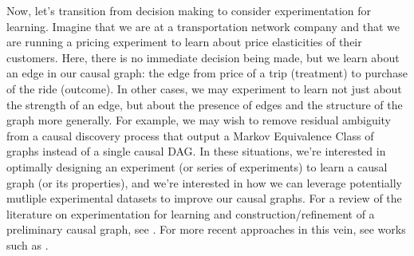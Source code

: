 Now, let's transition from decision making to consider experimentation for learning.
Imagine that we are at a transportation network company and that we are running a pricing experiment to learn about price elasticities of their customers.
Here, there is no immediate decision being made, but we learn about an edge in our causal graph: the edge from price of a trip (treatment) to purchase of the ride (outcome).
In other cases, we may experiment to learn not just about the strength of an edge, but about the presence of edges and the structure of the graph more generally.
For example, we may wish to remove residual ambiguity from a causal discovery process that output a Markov Equivalence Class of graphs instead of a single causal DAG.
In these situations, we're interested in optimally designing an experiment (or series of experiments) to learn a causal graph (or its properties), and we're interested in how we can leverage potentially mutliple experimental datasets to improve our causal graphs.
For a review of the literature on experimentation for learning and construction/refinement of a preliminary causal graph, see \citet[Sec. 3.1.2]{kalisch_2014_causal}.
For more recent approaches in this vein, see works such as \citet{triantafillou_2015_constraint, kocaoglu_2017_experimental, brouillard_2020_differentiable, rantanen_2020_learning}.
